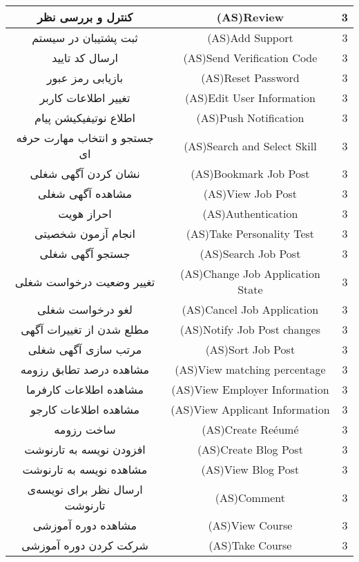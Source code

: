 \documentclass[12pt]{article}
\begin{document}
\begin{longtable}{|c|c|c|}
		\hline
		کنترل و بررسی نظر & (AS)Review 
		 & 3     \\
		\hline
		ثبت پشتیبان در سیستم & (AS)Add Support & 3     \\
		\hline
		ارسال کد تایید & (AS)Send Verification Code & 3     \\
		\hline
		بازیابی رمز عبور‌‌ & (AS)Reset Password & 3     \\
		\hline
		تغییر اطلاعات کاربر & (AS)Edit User Information & 3     \\
		\hline
		اطلاع نوتیفیکیشن پیام & (AS)Push Notification & 3     \\
		\hline
		جستجو و انتخاب مهارت حرفه ای & (AS)Search and Select Skill & 3     \\
		\hline
		نشان کردن آگهی شغلی & (AS)Bookmark Job Post & 3     \\
		\hline
		مشاهده آگهی شغلی & (AS)View Job Post & 3     \\
		\hline
		احراز هویت & (AS)Authentication & 3     \\
		\hline
		انجام آزمون شخصیتی & (AS)Take Personality Test & 3     \\
		\hline
		جستجو آگهی شغلی & (AS)Search Job Post & 3     \\
		\hline
		تغییر وضعیت درخواست شغلی & (AS)Change Job Application State & 3     \\
		\hline
		لغو درخواست شغلی & (AS)Cancel Job Application & 3     \\
		\hline
		مطلع شدن از تغییرات آگهی‌ & (AS)Notify Job Post changes & 3     \\
		\hline
		مرتب سازی آگهی شغلی & (AS)Sort Job Post & 3     \\
		\hline
		مشاهده درصد تطابق رزومه & (AS)View matching percentage & 3     \\
		\hline
		مشاهده اطلاعات کارفرما & (AS)View Employer Information & 3     \\
		\hline
		مشاهده اطلاعات کارجو & (AS)View Applicant Information & 3     \\
		\hline
		ساخت رزومه & (AS)Create Reéumé & 3     \\
		\hline
		افزودن نویسه به تارنوشت & (AS)Create Blog Post & 3     \\
		\hline
		مشاهده نویسه به تارنوشت & (AS)View Blog Post & 3     \\
		\hline
		ارسال نظر برای نویسه‌ی تارنوشت & (AS)Comment & 3     \\
		\hline
		مشاهده دوره آموزشی & (AS)View Course & 3     \\
		\hline
		شرکت کردن دوره آموزشی & (AS)Take Course & 3     \\

\end{longtable}
\end{document}
